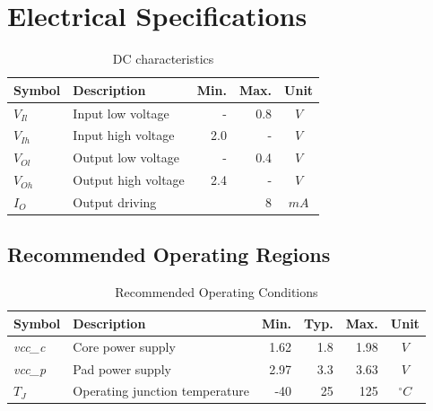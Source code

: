 \section{Electrical Specifications}
\begin{table}[htbp]
 \caption[DC characteristics]{DC characteristics \cite{faraday}}
 \label{tab:elect_rec}
\centering\begin{tabular}{|l|l|r|r|c|} \hline
Symbol & Description & Min. & Max. & Unit \\ \hline
$V_{Il}$ & Input low voltage & - & 0.8 & $V$ \\ \hline
$V_{Ih}$ & Input high voltage & 2.0 & - & $V$ \\ \hline
$V_{Ol}$ & Output low voltage & - & 0.4 & $V$ \\ \hline
$V_{Oh}$ & Output high voltage & 2.4 & - & $V$ \\ \hline
$I_O$ & Output driving & \multicolumn{2}{r|}{8} & $mA$ \\ \hline

 \end{tabular}
\end{table}

\subsection{Recommended Operating Regions}
\begin{table}[htbp]
 \caption[Recommended Operating Conditions]{Recommended Operating Conditions \cite{faraday}}
 \label{tab:elect_rec}
\centering\begin{tabular}{|l|l|r|r|r|c|} \hline
Symbol & Description & Min. & Typ. & Max. & Unit \\ \hline
\textit{vcc\_c} & Core power supply & 1.62 & 1.8 & 1.98 & $V$ \\ \hline
\textit{vcc\_p} & Pad power supply & 2.97 & 3.3 & 3.63 & $V$ \\ \hline
$T_J$ & Operating junction temperature & -40 & 25 & 125 & $^{\circ} C$ \\ \hline

 \end{tabular}
\end{table}
\clearpage
